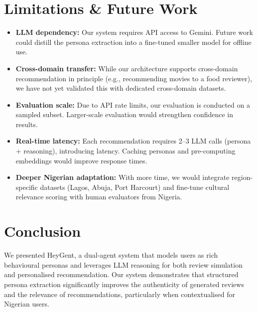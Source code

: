 \documentclass[11pt, a4paper]{article}
\begin{document}
\section{Limitations \& Future Work}

\begin{itemize}[leftmargin=2em]
    \item \textbf{LLM dependency:} Our system requires API access to Gemini. Future work could distill the persona extraction into a fine-tuned smaller model for offline use.

    \item \textbf{Cross-domain transfer:} While our architecture supports cross-domain recommendation in principle (e.g., recommending movies to a food reviewer), we have not yet validated this with dedicated cross-domain datasets.

    \item \textbf{Evaluation scale:} Due to API rate limits, our evaluation is conducted on a sampled subset. Larger-scale evaluation would strengthen confidence in results.

    \item \textbf{Real-time latency:} Each recommendation requires 2--3 LLM calls (persona + reasoning), introducing latency. Caching personas and pre-computing embeddings would improve response times.

    \item \textbf{Deeper Nigerian adaptation:} With more time, we would integrate region-specific datasets (Lagos, Abuja, Port Harcourt) and fine-tune cultural relevance scoring with human evaluators from Nigeria.
\end{itemize}

\section{Conclusion}

We presented HeyGent, a dual-agent system that models users as rich behavioural personas and leverages LLM reasoning for both review simulation and personalised recommendation. Our system demonstrates that structured persona extraction significantly improves the authenticity of generated reviews and the relevance of recommendations, particularly when contextualised for Nigerian users.
\end{document}
